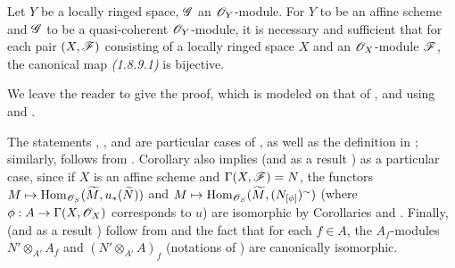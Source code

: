 \begin{cor}[1.8.10]
\label{1.1.8.10}
Let $Y$ be a locally ringed space, $\mathscr{G}$ an $\mathscr{O}_Y$-module. For $Y$ to be an affine scheme
and $\mathscr{G}$ to be a quasi-coherent $\mathscr{O}_Y$-module, it is necessary and sufficient that for
each pair $(X,\mathscr{F})$ consisting of a locally ringed space $X$ and an $\mathscr{O}_X$-module
$\mathscr{F}$, the canonical map {\em (1.8.9.1)} is bijective.
\end{cor}

We leave the reader to give the proof, which is modeled on that of , and
using  and .

\begin{rmk}[1.8.11]
\label{1.1.8.11}
The statements , , and  are particular
cases of , as well as the definition in ; similarly,
 follows from . Corollary  also implies
 (and as a result ) as a particular case, since if $X$ is
an affine scheme and $\Gamma(X,\mathscr{F})=N$, the functors
$M\mapsto{\mathop{\mathrm{Hom}}\nolimits}_{\mathscr{O}_S}(\widetilde{M},u_*(\widetilde{N}))$ and
$M\mapsto{\mathop{\mathrm{Hom}}\nolimits}_{\mathscr{O}_S}(\widetilde{M},(N_{[\phi]})^\sim)$ (where $\phi:A\to\Gamma(X,\mathscr{O}_X)$
corresponds to $u$) are isomorphic by Corollaries  and . Finally,
 (and as a result ) follow from  and the
fact that for each $f\in A$, the $A_f$-modules $N'\otimes_{A'}A_f$ and $(N'\otimes_{A'}A)_f$
(notations of ) are canonically isomorphic.
\end{rmk}

